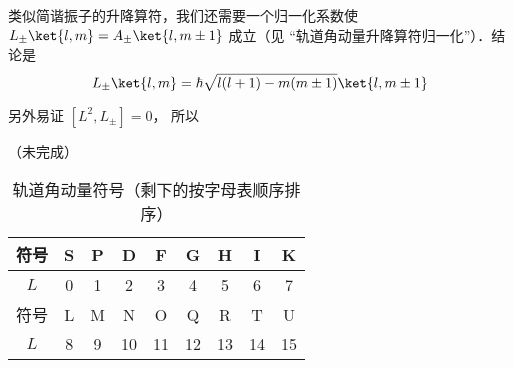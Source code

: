 类似简谐振子的升降算符，我们还需要一个归一化系数使 $L_\pm \ket{l,m} = A_ \pm \ket{l,m \pm 1}$ 成立（见 “轨道角动量升降算符归一化”）．结论是
\begin{equation}
L_\pm \ket{l, m}  = \hbar \sqrt{l(l + 1) - m(m \pm 1)} \ket{l, m \pm 1} 
\end{equation}

另外易证 $[L^2, L_\pm] = 0$， 所以 


（未完成）

\begin{table}[ht]
\centering
\caption{轨道角动量符号（剩下的按字母表顺序排序）}\label{QOrbAM_tab1}
\begin{tabular}{|c|c|c|c|c|c|c|c|c|}
\hline
符号 & S & P & D & F & G & H & I & K\\
\hline
$L$ & 0 & 1 & 2 & 3 & 4 & 5 & 6 & 7\\
\hline
符号 & L & M & N & O & Q & R & T & U \\
\hline
$L$ & 8 & 9 & 10 & 11 & 12 & 13 & 14 & 15 \\
\hline
\end{tabular}
\end{table}
